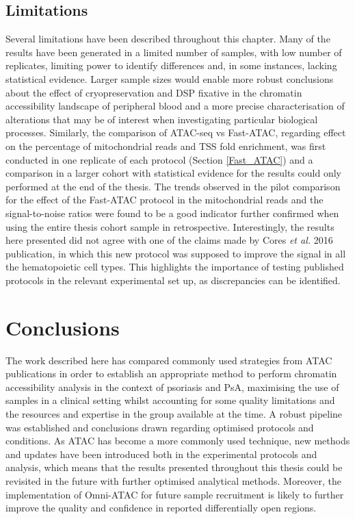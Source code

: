 
\subsection{Limitations}
Several limitations have been described throughout this chapter. Many of the results have been generated in a limited number of samples, with low number of replicates, limiting power to identify differences and, in some instances, lacking statistical evidence. Larger sample sizes would enable more robust conclusions about the effect of cryopreservation and DSP fixative in the chromatin accessibility landscape of peripheral blood and a more precise characterisation of alterations that may be of interest when investigating particular biological processes. Similarly, the comparison of ATAC-seq vs Fast-ATAC, regarding effect on the percentage of mitochondrial reads and TSS fold enrichment, was first conducted in one replicate of each protocol (Section \ref{Fast_ATAC}) and a comparison in a larger cohort with statistical evidence for the results could only performed at the end of the thesis. The trends observed in the pilot comparison for the effect of the Fast-ATAC protocol in the mitochondrial reads and the signal-to-noise ratios were found to be a good indicator further confirmed when using the entire thesis cohort sample in retrospective. Interestingly, the results here presented did not agree with one of the claims made by Cores \textit{et al.} 2016 publication, in which this new protocol was supposed to improve the signal in all the hematopoietic cell types. This highlights the importance of testing published protocols in the relevant experimental set up, as discrepancies can be identified.  


\section{Conclusions}
The work described here has compared commonly used strategies from ATAC publications in order to establish an appropriate method to perform chromatin accessibility analysis in the context of psoriasis and PsA, maximising the use of samples in a clinical setting whilst accounting for some quality limitations and the resources and expertise in the group available at the time. A robust pipeline was established and conclusions drawn regarding optimised protocols and conditions. As ATAC has become a more commonly used technique, new methods and updates have been introduced both in the experimental protocols and analysis, which means that the results presented throughout this thesis could be revisited in the future with further optimised analytical methods. Moreover, the implementation of Omni-ATAC for future sample recruitment is likely to further improve the quality and confidence in reported differentially open regions.
